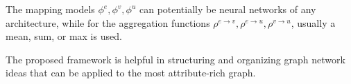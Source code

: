 The mapping models $\phi^e, \phi^v, \phi^u$ can potentially be neural networks of any architecture, while for the aggregation functions $\rho^{e \to v},\rho^{e \to u},\rho^{v \to u}$, usually a mean, sum, or max is used.

The proposed framework is helpful in structuring and organizing graph network ideas that can be applied to the most attribute-rich graph.